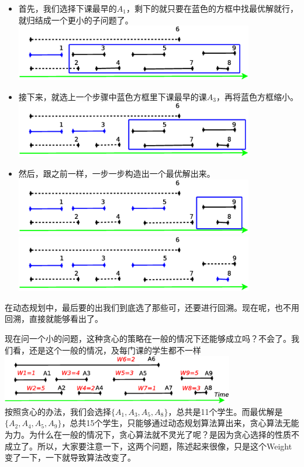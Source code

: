 	\begin{itemize}
		\item
		首先，我们选择下课最早的$A_1$，剩下的就只要在蓝色的方框中找最优解就行，就归结成一个更小的子问题了。\\
		 \includegraphics[width=4.1in]{L7-intervalschedulingexamplegreedystep1.eps}
		 \item
		 接下来，就选上一个步骤中蓝色方框里下课最早的课$A_3$，再将蓝色方框缩小。\\
		 \includegraphics[width=4.1in]{L7-intervalschedulingexamplegreedystep2.eps}
		 \item
		 然后，跟之前一样，一步一步构造出一个最优解出来。\\
		 \includegraphics[width=4.1in]{L7-intervalschedulingexamplegreedystep3.eps}\\
		 \includegraphics[width=4.1in]{L7-intervalschedulingexamplegreedystep4.eps}
	\end{itemize}
	在动态规划中，最后要的出我们到底选了那些可，还要进行回溯。现在呢，也不用回溯，直接就能够看出了。
	
	现在问一个小的问题，这种贪心的策略在一般的情况下还能够成立吗？不会了。我们看，还是这个一般的情况，及每门课的学生都不一样\\
	\includegraphics[width=4in] {L7-intervalschedulingexample.eps}\\
	按照贪心的办法，我们会选择$ \{ A_1, A_3, A_5, A_8 \} $，总共是11个学生。而最优解是$ \{ A_2, A_4, A_5, A_9 \}$，总共15个学生，只能够通过动态规划算法算出来，贪心算法无能为力。为什么在一般的情况下，贪心算法就不灵光了呢？是因为贪心选择的性质不成立了。所以，大家要注意一下，这两个问题，陈述起来很像，只是这个Weight变了一下，一下就导致算法改变了。
	
